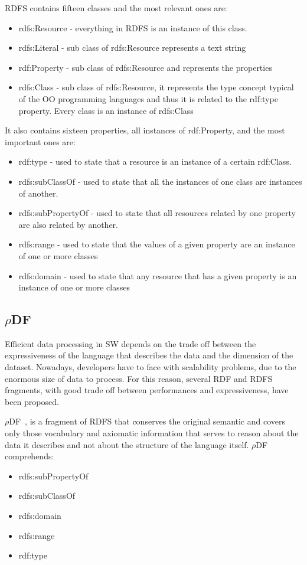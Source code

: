 RDFS contains fifteen classes and the most relevant ones are:

\begin{itemize}
\item rdfs:Resource - everything in RDFS is an instance of this class.
\item rdfs:Literal  -  sub class of rdfs:Resource represents a text string
\item rdf:Property  -  sub class of rdfs:Resource and represents the properties
\item rdfs:Class    -  sub class of rdfs:Resource, it represents the type concept typical of the OO programming languages and thus it is related to the rdf:type property. Every class is an instance of rdfs:Class
\end{itemize}

It also contains sixteen properties, all instances of rdf:Property, and the most important ones are:
\begin{itemize}
\item rdf:type - used to state that a resource is an instance of a certain rdf:Class.
\item rdfs:subClassOf - used to state that all the instances of one class are instances of another.
\item rdfs:subPropertyOf - used to state that all resources related by one property are also related by another.
\item rdfs:range - used to state that the values of a given property are an instance of one or more classes
\item rdfs:domain -  used to state that any resource that has a given property is an instance of one or more classes
\end{itemize}


\subsection{$\rho$DF}\label{sec:rhodf}

Efficient data processing in SW depends on the trade off between the expressiveness of the language that describes the data and the dimension of the dataset. Nowadays, developers have to face with scalability problems, due to the enormous size of data to process. For this reason, several RDF and RDFS fragments, with good trade off between performances and expressiveness, have been proposed.

$\rho$DF~\cite{DBLP:conf/esws/MunozPG07}, is a fragment of RDFS that conserves the original semantic and covers only those vocabulary and axiomatic information that  serves to reason about the data it describes and not about the structure of the language itself. $\rho$DF comprehends:
\begin{itemize}
\item rdfs:subPropertyOf
\item rdfs:subClassOf
\item rdfs:domain 
\item rdfs:range
\item rdf:type 
\end{itemize}

